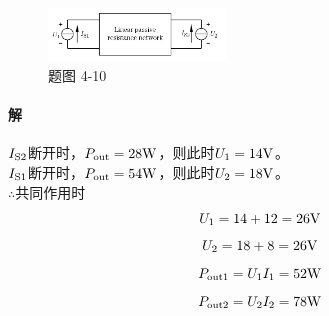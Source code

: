 \documentclass[hyperref, UTF8]{ctexart}
\newcommand{\volt}{{\rm V}}
\newcommand{\source}{{\rm S}}
\newcommand{\watt}{{\rm W}}
\begin{document}
\begin{figure}[!htb]
\centering
\includegraphics[width=0.423\textwidth]{p4-10.png}
\caption*{题图 4-10}
\end{figure}

\paragraph{解}
$I_{\source 2}$断开时，$P_{\rm out}=28\watt$，则此时$U_1=14\volt$。\\

$I_{\source 1}$断开时，$P_{\rm out}=54\watt$，则此时$U_2=18\volt$。\\

$\therefore$共同作用时
$$ U_1=14+12=26\volt $$
$$ U_2=18+8=26\volt $$
$$ P_{\rm out1}=U_1I_1=52\watt $$
$$ P_{\rm out2}=U_2I_2=78\watt $$
\end{document}
